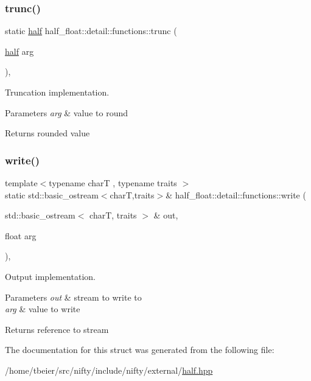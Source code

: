 \subsubsection{\texorpdfstring{trunc()}{trunc()}}
{\footnotesize\ttfamily static \hyperlink{classhalf__float_1_1half}{half} half\+\_\+float\+::detail\+::functions\+::trunc (\begin{DoxyParamCaption}\item[{\hyperlink{classhalf__float_1_1half}{half}}]{arg }\end{DoxyParamCaption})\hspace{0.3cm}{\ttfamily [inline]}, {\ttfamily [static]}}

Truncation implementation. 
\begin{DoxyParams}{Parameters}
{\em arg} & value to round \\
\hline
\end{DoxyParams}
\begin{DoxyReturn}{Returns}
rounded value 
\end{DoxyReturn}
\mbox{\label{structhalf__float_1_1detail_1_1functions_a240e518b170e2c43df73fe28c3be7ed3}} 
\subsubsection{\texorpdfstring{write()}{write()}}
{\footnotesize\ttfamily template$<$typename charT , typename traits $>$ \\
static std\+::basic\+\_\+ostream$<$charT,traits$>$\& half\+\_\+float\+::detail\+::functions\+::write (\begin{DoxyParamCaption}\item[{std\+::basic\+\_\+ostream$<$ charT, traits $>$ \&}]{out,  }\item[{float}]{arg }\end{DoxyParamCaption})\hspace{0.3cm}{\ttfamily [inline]}, {\ttfamily [static]}}

Output implementation. 
\begin{DoxyParams}{Parameters}
{\em out} & stream to write to \\
\hline
{\em arg} & value to write \\
\hline
\end{DoxyParams}
\begin{DoxyReturn}{Returns}
reference to stream 
\end{DoxyReturn}


The documentation for this struct was generated from the following file\+:\begin{DoxyCompactItemize}
\item 
/home/tbeier/src/nifty/include/nifty/external/\hyperlink{half_8hpp}{half.\+hpp}\end{DoxyCompactItemize}
